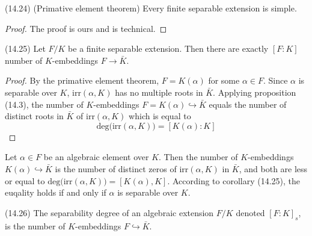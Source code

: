 \vspace{2ex}
\begin{prop}
(14.24) (Primative element theorem) Every finite separable extension is simple. 
\end{prop}
\vspace{2ex}
\begin{proof}
The proof is ours and is technical. 
\end{proof}
\vspace{2ex}
\begin{cor}
(14.25) Let $F/K$ be a finite separable extension. Then there are exactly $[F:K]$ number of $K$-embeddings $F\rightarrow \bar{K}$. 
\end{cor}
\vspace{2ex}
\begin{proof}
By the primative element theorem, $F=K(\alpha )$ for some $\alpha \in F$. Since $\alpha $ is separable over $K$, $\mathrm{irr}(\alpha ,K)$ has no multiple roots in $\bar{K}$. Applying proposition (14.3), the number of $K$-embeddings $F=K(\alpha )\hookrightarrow \bar{K}$ equals the number of distinct roots in $\bar{K}$ of $\mathrm{irr}(\alpha ,K)$ which is equal to 
\[\mathrm{deg}\big(\mathrm{irr}(\alpha ,K)\big)=[K(\alpha ):K]\]
\end{proof}
\vspace{2ex}
\begin{rmk}
Let $\alpha \in F$ be an algebraic element over $K$. Then the number of $K$-embeddings $K(\alpha )\hookrightarrow \bar{K}$ is the number of distinct zeros of $\mathrm{irr}(\alpha ,K)$ in $\bar{K}$, and both are less or equal to $\mathrm{deg}\big(\mathrm{irr}(\alpha ,K)\big)=[K(\alpha ),K]$. According to corollary (14.25), the euqality holds if and only if $\alpha $ is separable over $K$. 
\end{rmk}
\vspace{2ex}
\begin{defi}
(14.26) The separability degree of an algebraic extension $F/K$ denoted $[F:K]_{s}$, is the number of $K$-embeddings $F\hookrightarrow \bar{K}$. 
\end{defi}
\vspace{2ex}

